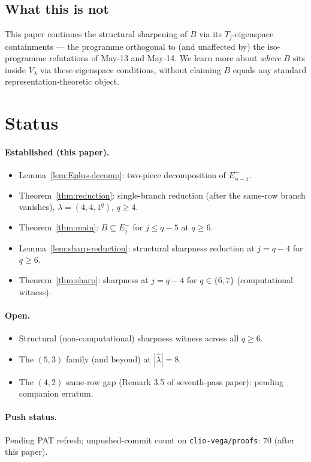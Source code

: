 \documentclass[11pt]{article}
\theoremstyle{definition}
\newcommand{\hatl}{\widehat\lambda}
\begin{document}
\subsection{What this is not}

This paper continues the structural sharpening of $B$ via its
$T_j$-eigenspace containments --- the programme orthogonal to (and
unaffected by) the iso-programme refutations of May-13 and May-14.
We learn more about \emph{where} $B$ sits inside $V_\lambda$ via
these eigenspace conditions, without claiming $B$ equals any standard
representation-theoretic object.

\section{Status}\label{sec:status}

\paragraph{Established (this paper).}
\begin{itemize}[topsep=0.3em,itemsep=0.1em]
\item Lemma~\ref{lem:Eplus-decomp}: two-piece decomposition of
   $E_{n-1}^+$.
\item Theorem~\ref{thm:reduction}: single-branch reduction (after the
   same-row branch vanishes), $\lambda = (4, 4, 1^q)$, $q \ge 4$.
\item Theorem~\ref{thm:main}: $B \subseteq E_j^-$ for $j \le q - 5$
   at $q \ge 6$.
\item Lemma~\ref{lem:sharp-reduction}: structural sharpness
   reduction at $j = q - 4$ for $q \ge 6$.
\item Theorem~\ref{thm:sharp}: sharpness at $j = q - 4$ for
   $q \in \{6, 7\}$ (computational witness).
\end{itemize}

\paragraph{Open.}
\begin{itemize}[topsep=0.3em,itemsep=0.1em]
\item Structural (non-computational) sharpness witness across all
   $q \ge 6$.
\item The $(5, 3)$ family (and beyond) at $|\hatl| = 8$.
\item The $(4, 2)$ same-row gap (Remark 3.5 of seventh-pass paper):
   pending companion erratum.
\end{itemize}

\paragraph{Push status.}
Pending PAT refresh; unpushed-commit count on
\texttt{clio-vega/proofs}: 70 (after this paper).
\end{document}
